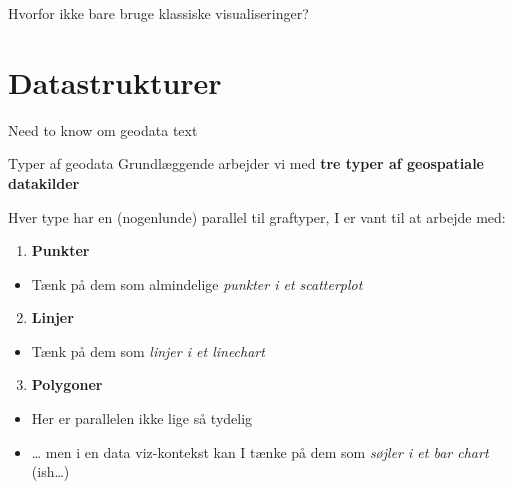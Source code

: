 \documentclass[
  8pt,
  ignorenonframetext,
  aspectratio=169]{beamer}
\providecommand{\tightlist}{%
  \setlength{\itemsep}{0pt}\setlength{\parskip}{0pt}}
\begin{document}
\begin{frame}{Hvorfor ikke bare bruge klassiske visualiseringer?}
\protect\hypertarget{hvorfor-ikke-bare-bruge-klassiske-visualiseringer}{}
\end{frame}

\hypertarget{datastrukturer}{%
\section{Datastrukturer}\label{datastrukturer}}

\begin{frame}{Need to know om geodata}
\protect\hypertarget{need-to-know-om-geodata}{}
text
\end{frame}

\begin{frame}{Typer af geodata}
\protect\hypertarget{typer-af-geodata}{}
Grundlæggende arbejder vi med \textbf{tre typer af geospatiale
datakilder}

Hver type har en (nogenlunde) parallel til graftyper, I er vant til at
arbejde med:

\bigskip

\begin{enumerate}
\tightlist
\item
  \textbf{Punkter}
\end{enumerate}

\begin{itemize}
\tightlist
\item
  Tænk på dem som almindelige \emph{punkter i et scatterplot}
\end{itemize}

\begin{enumerate}
\setcounter{enumi}{1}
\tightlist
\item
  \textbf{Linjer}
\end{enumerate}

\begin{itemize}
\tightlist
\item
  Tænk på dem som \emph{linjer i et linechart}
\end{itemize}

\begin{enumerate}
\setcounter{enumi}{2}
\tightlist
\item
  \textbf{Polygoner}
\end{enumerate}

\begin{itemize}
\tightlist
\item
  Her er parallelen ikke lige så tydelig
\item
  \ldots{} men i en data viz-kontekst kan I tænke på dem som
  \emph{søjler i et bar chart} (ish\ldots)
\end{itemize}
\end{frame}
\end{document}
